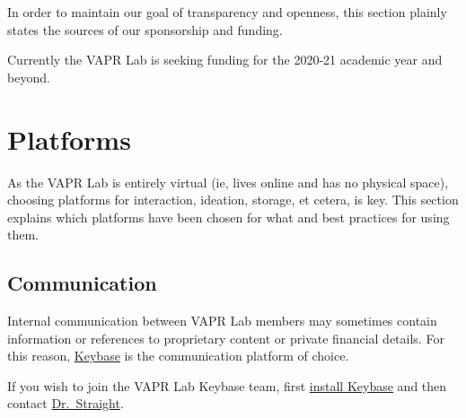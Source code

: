 \documentclass[
  12pt,
]{memoir}
\begin{document}
In order to maintain our goal of transparency and openness, this section plainly states the sources of our sponsorship and funding.

Currently the VAPR Lab is seeking funding for the 2020-21 academic year and beyond.

\hypertarget{platforms}{%
\chapter{Platforms}\label{platforms}}

As the VAPR Lab is entirely virtual (ie, lives online and has no physical space), choosing platforms for interaction, ideation, storage, et cetera, is key. This section explains which platforms have been chosen for what and best practices for using them.

\hypertarget{communication}{%
\section{Communication}\label{communication}}

Internal communication between VAPR Lab members may sometimes contain information or references to proprietary content or private financial details. For this reason, \href{https://keybase.io}{Keybase} is the communication platform of choice.

If you wish to join the VAPR Lab Keybase team, first \href{https://keybase.io/download}{install Keybase} and then contact \href{https://keybase.io/ryanstraight}{Dr.~Straight}.

  
\end{document}
